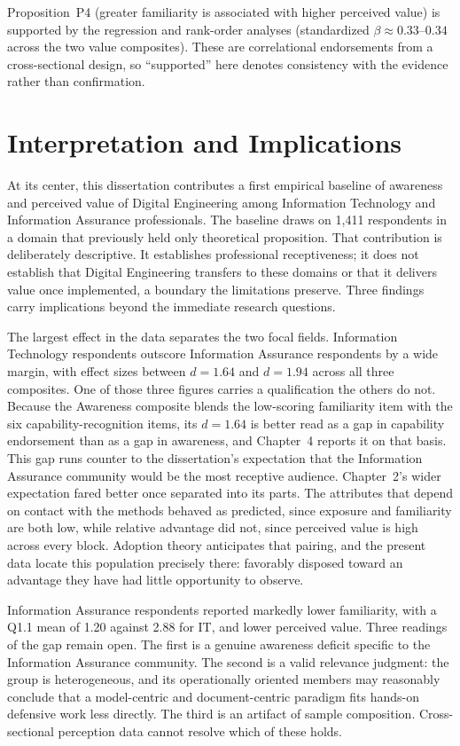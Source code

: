 Proposition~P4 (greater familiarity is associated with higher perceived value) is supported by the regression and rank-order analyses (standardized $\beta \approx 0.33$--$0.34$ across the two value composites). These are correlational endorsements from a cross-sectional design, so ``supported'' here denotes consistency with the evidence rather than confirmation.

\section{Interpretation and Implications}

At its center, this dissertation contributes a first empirical baseline of awareness and perceived value of Digital Engineering among Information Technology and Information Assurance professionals. The baseline draws on 1{,}411 respondents in a domain that previously held only theoretical proposition. That contribution is deliberately descriptive. It establishes professional receptiveness; it does not establish that Digital Engineering transfers to these domains or that it delivers value once implemented, a boundary the limitations preserve. Three findings carry implications beyond the immediate research questions.

The largest effect in the data separates the two focal fields. Information Technology respondents outscore Information Assurance respondents by a wide margin, with effect sizes between $d=1.64$ and $d=1.94$ across all three composites. One of those three figures carries a qualification the others do not. Because the Awareness composite blends the low-scoring familiarity item with the six capability-recognition items, its $d=1.64$ is better read as a gap in capability endorsement than as a gap in awareness, and Chapter~4 reports it on that basis. This gap runs counter to the dissertation's expectation that the Information Assurance community would be the most receptive audience. Chapter~2's wider expectation fared better once separated into its parts. The attributes that depend on contact with the methods behaved as predicted, since exposure and familiarity are both low, while relative advantage did not, since perceived value is high across every block. Adoption theory anticipates that pairing, and the present data locate this population precisely there: favorably disposed toward an advantage they have had little opportunity to observe.

Information Assurance respondents reported markedly lower familiarity, with a Q1.1 mean of 1.20 against 2.88 for IT, and lower perceived value. Three readings of the gap remain open. The first is a genuine awareness deficit specific to the Information Assurance community. The second is a valid relevance judgment: the group is heterogeneous, and its operationally oriented members may reasonably conclude that a model-centric and document-centric paradigm fits hands-on defensive work less directly. The third is an artifact of sample composition. Cross-sectional perception data cannot resolve which of these holds.

